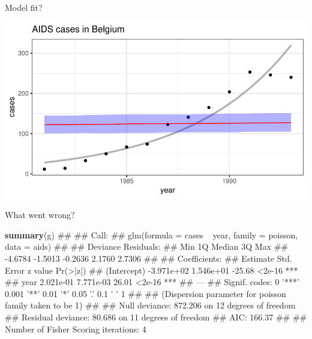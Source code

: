 \documentclass[11pt,ignorenonframetext,]{beamer}
\newenvironment{Shaded}{}{}
\newcommand{\KeywordTok}[1]{\textcolor[rgb]{0.00,0.44,0.13}{\textbf{{#1}}}}
\newcommand{\NormalTok}[1]{{#1}}
\let\oldShaded\Shaded
\let\endoldShaded\endShaded
\renewenvironment{Shaded}{\footnotesize\begin{spacing}{0.9}\oldShaded}{\endoldShaded\end{spacing}}
\begin{document}
\begin{frame}{Model fit?}

\includegraphics{Lec3_files/figure-beamer/unnamed-chunk-19-1.pdf}

\end{frame}

\begin{frame}[fragile]{What went wrong?}

\pause

\begin{Shaded}
\begin{Highlighting}[]
\KeywordTok{summary}\NormalTok{(g)}
\NormalTok{## }
\NormalTok{## Call:}
\NormalTok{## glm(formula = cases ~ year, family = poisson, data = aids)}
\NormalTok{## }
\NormalTok{## Deviance Residuals: }
\NormalTok{##     Min       1Q   Median       3Q      Max  }
\NormalTok{## -4.6784  -1.5013  -0.2636   2.1760   2.7306  }
\NormalTok{## }
\NormalTok{## Coefficients:}
\NormalTok{##               Estimate Std. Error z value Pr(>|z|)    }
\NormalTok{## (Intercept) -3.971e+02  1.546e+01  -25.68   <2e-16 ***}
\NormalTok{## year         2.021e-01  7.771e-03   26.01   <2e-16 ***}
\NormalTok{## ---}
\NormalTok{## Signif. codes:  0 '***' 0.001 '**' 0.01 '*' 0.05 '.' 0.1 ' ' 1}
\NormalTok{## }
\NormalTok{## (Dispersion parameter for poisson family taken to be 1)}
\NormalTok{## }
\NormalTok{##     Null deviance: 872.206  on 12  degrees of freedom}
\NormalTok{## Residual deviance:  80.686  on 11  degrees of freedom}
\NormalTok{## AIC: 166.37}
\NormalTok{## }
\NormalTok{## Number of Fisher Scoring iterations: 4}
\end{Highlighting}
\end{Shaded}

\end{frame}
\end{document}
